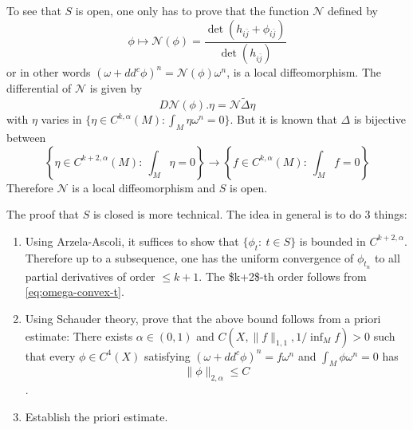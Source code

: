 \documentclass[11pt]{article}
\begin{document}
To see that \(S\) is open, one only has to prove that the function \(\mathcal{N}\) defined by
\[
\phi\mapsto \mathcal{N}(\phi)= \frac{\det(h_{i\bar j} + \phi_{i\bar j})}{\det(h_{i\bar j})}
\]
or in other words \((\omega + dd^c\phi)^n = \mathcal{N}(\phi)\omega^n\), is a local
diffeomorphism. The differential of \(\mathcal{N}\) is given by
\[
D \mathcal{N}(\phi).\eta = \mathcal{N}\tilde\Delta\eta
\]
with \(\eta\) varies in \(\{\eta\in C^{k,\alpha}(M):\int_M\eta\omega^n=0\}\). But it is known that
\(\Delta\) is bijective between
\[
\left\{\eta\in C^{k+2,\alpha}(M):\ \int_M\eta = 0\right\} \longrightarrow \left\{f\in C^{k,\alpha}(M):\ \int_M f=0\right\}
\]
Therefore \(\mathcal{N}\) is a local diffeomorphism and \(S\) is open.

The proof that \(S\) is closed is more technical. The idea in general is to do 3 things:
\begin{enumerate}
\item Using Arzela-Ascoli, it suffices to show that \(\{\phi_t:\ t\in S\}\) is bounded in
\(C^{k+2,\alpha}\). Therefore up to a subsequence, one has the uniform convergence of \(\phi_{t_n}\)
to all partial derivatives of order \(\leq k+1\). The \$k+2\$-th order follows from \eqref{eq:omega-convex-t}.
\item Using Schauder theory, prove that the above bound follows from a priori estimate: There exists
\(\alpha\in (0,1)\) and \(C(X,\|f\|_{1,1}, 1/\inf_M f)>0\) such that every \(\phi\in C^4(X)\)
satisfying \((\omega +dd^c\phi)^n = f\omega^n\) and \(\int_M \phi\omega^n=0\) has \[\|
   \phi\|_{2,\alpha} \leq C\].
\item Establish the priori estimate.
\end{enumerate}
\end{document}
